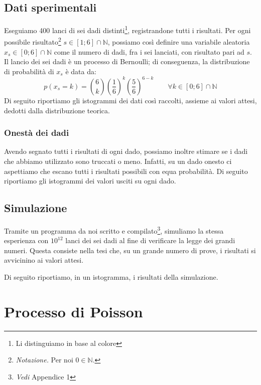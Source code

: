 \documentclass{article}
\begin{document}
\subsection{Dati sperimentali}
Eseguiamo 400 lanci di sei dadi distinti\footnote{Li distinguiamo in base al colore},
registrandone tutti i risultati.
Per ogni possibile risultato\footnote{
    \emph{Notazione.} Per noi $0\in\mathbb{N}$.
} $s\in\left[1;6\right]\cap\mathbb{N}$, possiamo così
definire una variabile aleatoria $x_s\in\left[0;6\right]\cap\mathbb{N}$ come il
numero di dadi, fra i sei lanciati, con risultato pari ad $s$.
Il lancio dei sei dadi è un processo di Bernoulli; di conseguenza,
la distribuzione di probabilità di $x_s$ è data da:
\[
    p \left(x_s=k\right) =
        \binom{6}{k}
        \left(\frac{1}{6}\right)^k
        \left(\frac{5}{6}\right)^{6-k}
        \qquad\forall k\in\left[0;6\right]\cap\mathbb{N}
\]
Di seguito riportiamo gli istogrammi dei dati così raccolti, assieme ai valori attesi,
dedotti dalla distribuzione teorica.

\begin{figure*}
    \caption{...}
\end{figure*}

\subsubsection*{Onestà dei dadi}
Avendo segnato tutti i risultati di ogni dado, possiamo inoltre stimare se i dadi che
abbiamo utilizzato sono truccati o meno. Infatti, su un dado onesto ci aspettiamo
che escano tutti i risultati possibili con equa probabilità. Di seguito riportiamo
gli istogrammi dei valori usciti su ogni dado.

\begin{figure*}
    \caption{...}
\end{figure*}

\subsection{Simulazione}
Tramite un programma da noi scritto e compilato\footnote{\emph{Vedi} Appendice 1},
simuliamo la stessa esperienza con $10^{12}$ lanci dei sei dadi al fine di
verificare la legge dei grandi numeri. Questa consiste nella tesi che, su un grande
numero di prove, i risultati si avvicinino ai valori attesi.

Di seguito riportiamo, in un istogramma, i risultati della simulazione.

\section{Processo di Poisson}
\end{document}
